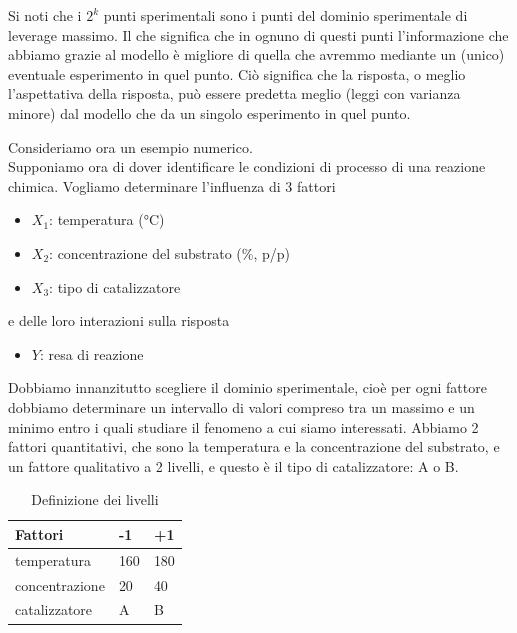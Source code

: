 \documentclass[
]{book}
\providecommand{\tightlist}{%
  \setlength{\itemsep}{0pt}\setlength{\parskip}{0pt}}
\begin{document}
Si noti che i \(2^k\) punti sperimentali sono i punti del dominio sperimentale di leverage massimo. Il che significa che in ognuno di questi punti l'informazione che abbiamo grazie al modello è migliore di quella che avremmo mediante un (unico) eventuale esperimento in quel punto. Ciò significa che la risposta, o meglio l'aspettativa della risposta, può essere predetta meglio (leggi con varianza minore) dal modello che da un singolo esperimento in quel punto. \newline

Consideriamo ora un esempio numerico.\\
Supponiamo ora di dover identificare le condizioni di processo di una reazione chimica. Vogliamo determinare l'influenza di 3 fattori

\begin{itemize}
\item
  \(X_1\): temperatura (°C)
\item
  \(X_2\): concentrazione del substrato (\%, p/p)
\item
  \(X_3\): tipo di catalizzatore
\end{itemize}

e delle loro interazioni sulla risposta

\begin{itemize}
\tightlist
\item
  \(Y\): resa di reazione
\end{itemize}

Dobbiamo innanzitutto scegliere il dominio sperimentale, cioè per ogni fattore dobbiamo determinare un intervallo di valori compreso tra un massimo e un minimo entro i quali studiare il fenomeno a cui siamo interessati. Abbiamo 2 fattori quantitativi, che sono la temperatura e la concentrazione del substrato, e un fattore qualitativo a 2 livelli, e questo è il tipo di catalizzatore: A o B.

\begin{table}

\caption{\label{tab:liv}Definizione dei livelli\label{livelli}}
\centering
\begin{tabular}[t]{l|l|l}
\hline
Fattori & -1 & +1\\
\hline
temperatura & 160 & 180\\
\hline
concentrazione & 20 & 40\\
\hline
catalizzatore & A & B\\
\hline
\end{tabular}
\end{table}
\end{document}
